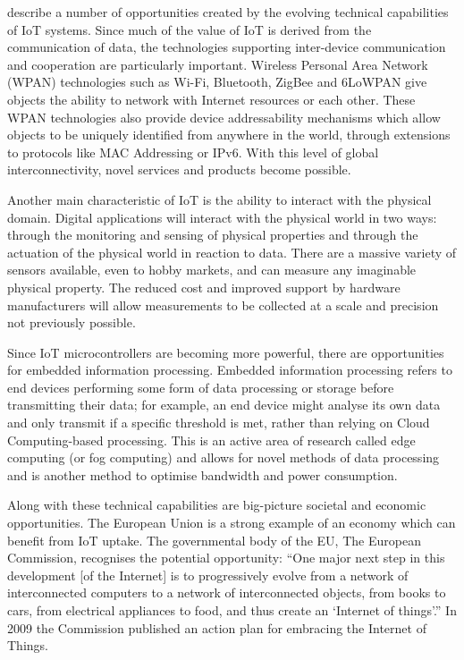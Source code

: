     \citet{fromIoC} describe a number of opportunities created by the evolving technical capabilities of IoT systems. Since much of the value of IoT is derived from the communication of data, the technologies supporting inter-device communication and cooperation are particularly important. Wireless Personal Area Network (WPAN) technologies such as Wi-Fi, Bluetooth, ZigBee and 6LoWPAN give objects the ability to network with Internet resources or each other. These WPAN technologies also provide device addressability mechanisms which allow objects to be uniquely identified from anywhere in the world, through extensions to protocols like MAC Addressing or IPv6. With this level of global interconnectivity, novel services and products become possible.

    Another main characteristic of IoT is the ability to interact with the physical domain. Digital applications will interact with the physical world in two ways: through the monitoring and sensing of physical properties and through the actuation of the physical world in reaction to data. There are a massive variety of sensors available, even to hobby markets, and can measure any imaginable physical property. The reduced cost and improved support by hardware manufacturers will allow measurements to be collected at a scale and precision not previously possible.

    Since IoT microcontrollers are becoming more powerful, there are opportunities for embedded information processing. Embedded information processing refers to end devices performing some form of data processing or storage before transmitting their data; for example, an end device might analyse its own data and only transmit if a specific threshold is met, rather than relying on Cloud Computing-based processing. This is an active area of research called edge computing (or fog computing) and allows for novel methods of data processing and is another method to optimise bandwidth and power consumption.

    Along with these technical capabilities are big-picture societal and economic opportunities. The European Union is a strong example of an economy which can benefit from IoT uptake. The governmental body of the EU, The European Commission, recognises the potential opportunity: ``One major next step in this development [of the Internet] is to progressively evolve from a network of interconnected computers to a network of interconnected objects, from books to cars, from electrical appliances to food, and thus create an ‘Internet of things’.'' In 2009 the Commission published an action plan for embracing the Internet of Things.

